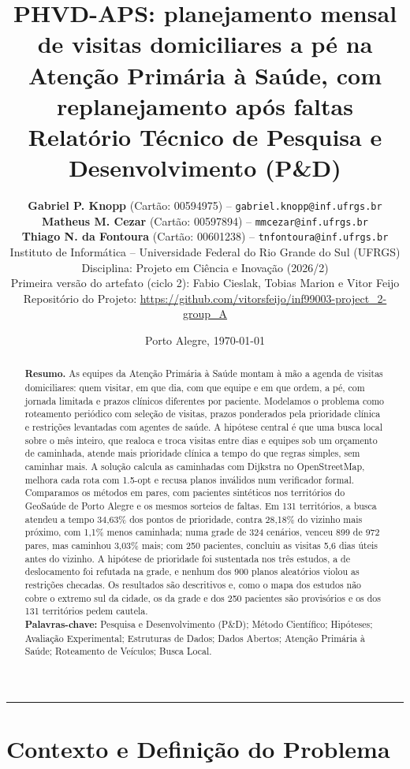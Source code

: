 \documentclass[11pt,a4paper]{article}
\title{
    \vspace{-1.0cm}
    \textbf{\Large PHVD-APS: planejamento mensal de visitas domiciliares a pé na Atenção Primária à Saúde, com replanejamento após faltas}\\[0.3cm]
    \large Relatório Técnico de Pesquisa e Desenvolvimento (P\&D)
}
\author{
    \textbf{Gabriel P. Knopp} (Cartão: 00594975) -- \texttt{gabriel.knopp@inf.ufrgs.br}\\
    \textbf{Matheus M. Cezar} (Cartão: 00597894) -- \texttt{mmcezar@inf.ufrgs.br}\\
    \textbf{Thiago N. da Fontoura} (Cartão: {00601238}) -- \texttt{tnfontoura@inf.ufrgs.br}\\[0.3cm]
    \normalsize Instituto de Informática -- Universidade Federal do Rio Grande do Sul (UFRGS)\\
    \normalsize Disciplina: Projeto em Ciência e Inovação (2026/2)\\
    \small Primeira versão do artefato (ciclo 2): Fabio Cieslak, Tobias Marion e Vitor Feijo\\
    \small Repositório do Projeto: \url{https://github.com/vitorsfeijo/inf99003-project_2-group_A}
}
\date{Porto Alegre, \today}
\begin{document}
\maketitle
\thispagestyle{fancy}

\begin{abstract}
\noindent
\textbf{Resumo.}
As equipes da Atenção Primária à Saúde montam à mão a agenda de visitas domiciliares: quem visitar, em que dia, com que equipe e em que ordem, a pé, com jornada limitada e prazos clínicos diferentes por paciente. Modelamos o problema como roteamento periódico com seleção de visitas, prazos ponderados pela prioridade clínica e restrições levantadas com agentes de saúde. A hipótese central é que uma busca local sobre o mês inteiro, que realoca e troca visitas entre dias e equipes sob um orçamento de caminhada, atende mais prioridade clínica a tempo do que regras simples, sem caminhar mais. A solução calcula as caminhadas com Dijkstra no OpenStreetMap, melhora cada rota com 1.5-opt e recusa planos inválidos num verificador formal. Comparamos os métodos em pares, com pacientes sintéticos nos territórios do GeoSaúde de Porto Alegre e os mesmos sorteios de faltas. Em 131 territórios, a busca atendeu a tempo 34,63\% dos pontos de prioridade, contra 28,18\% do vizinho mais próximo, com 1,1\% menos caminhada; numa grade de 324 cenários, venceu 899 de 972 pares, mas caminhou 3,03\% mais; com 250 pacientes, concluiu as visitas 5,6 dias úteis antes do vizinho. A hipótese de prioridade foi sustentada nos três estudos, a de deslocamento foi refutada na grade, e nenhum dos 900 planos aleatórios violou as restrições checadas. Os resultados são descritivos e, como o mapa dos estudos não cobre o extremo sul da cidade, os da grade e dos 250 pacientes são provisórios e os dos 131 territórios pedem cautela.
\\[0.3cm]
\textbf{Palavras-chave:} Pesquisa e Desenvolvimento (P\&D); Método Científico; Hipóteses; Avaliação Experimental; Estruturas de Dados; Dados Abertos; Atenção Primária à Saúde; Roteamento de Veículos; Busca Local.
\end{abstract}

\vspace{0.3cm}
\hrule
\vspace{0.4cm}

\section{Contexto e Definição do Problema}
\end{document}

